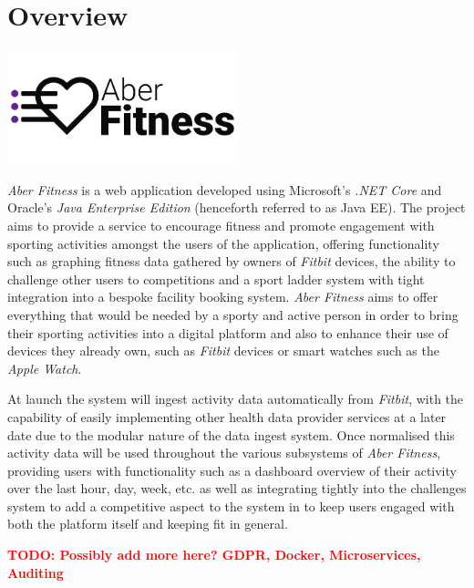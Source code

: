 \chapter{Overview}

\begin{center}
	\includegraphics[width=0.5\textwidth]{Images/aberfitness.png}
\end{center}

\textit{Aber Fitness} is a web application developed using Microsoft's \textit{.NET Core} and Oracle's \textit{Java Enterprise Edition} (henceforth referred to as Java EE). The project aims to provide a service to encourage fitness and promote engagement with sporting activities amongst the users of the application, offering functionality such as graphing fitness data gathered by owners of \textit{Fitbit} devices, the ability to challenge other users to competitions and a sport ladder system with tight integration into a bespoke facility booking system. \textit{Aber Fitness} aims to offer everything that would be needed by a sporty and active person in order to bring their sporting activities into a digital platform and also to enhance their use of devices they already own, such as \textit{Fitbit} devices or smart watches such as the \textit{Apple Watch}.

At launch the system will ingest activity data automatically from \textit{Fitbit}, with the capability of easily implementing other health data provider services at a later date due to the modular nature of the data ingest system. Once normalised this activity data will be used throughout the various subsystems of \textit{Aber Fitness}, providing users with functionality such as a dashboard overview of their activity over the last hour, day, week, etc. as well as integrating tightly into the challenges system to add a competitive aspect to the system in to keep users engaged with both the platform itself and keeping fit in general. 

\textcolor{red}{\textbf{TODO: Possibly add more here? GDPR, Docker, Microservices, Auditing}}